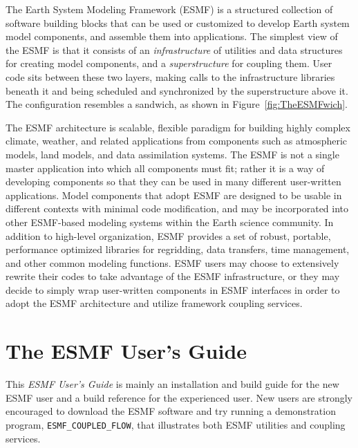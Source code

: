 


The Earth System Modeling Framework (ESMF) is a structured collection of 
software building blocks that can be used or customized to develop 
Earth system model components, and assemble them into applications.  
The simplest view of the ESMF is that it consists of an {\it infrastructure} 
of utilities and data structures for creating 
model components, and a {\it superstructure} for coupling them.  
User code sits between these two layers, making calls to the infrastructure
libraries beneath it and being scheduled and synchronized by the 
superstructure above it.  The configuration resembles a sandwich, as
shown in Figure~\ref{fig:TheESMFwich}.

The ESMF architecture is scalable, flexible paradigm for building highly 
complex climate, weather, and related applications from components such
as atmospheric models, land models, and data assimilation systems.  The 
ESMF is not a single master application into which all components must fit; 
rather it is a way of developing components so that they can be used 
in many different user-written applications.  Model components that adopt 
ESMF are designed to be usable in different contexts with minimal code
modification, and may be
incorporated into other ESMF-based modeling systems within the Earth 
science community.  In addition to high-level organization, ESMF provides 
a set of robust, portable, performance optimized libraries for regridding, 
data transfers, time management, and other common modeling functions.  
ESMF users may choose to extensively rewrite their codes to take advantage 
of the ESMF infrastructure, or they may decide to simply wrap user-written 
components in ESMF interfaces in order to adopt the ESMF architecture and 
utilize framework coupling services.

\section{The ESMF User's Guide}

This {\it ESMF User's Guide} is mainly an installation and build guide for
the new ESMF user and a build reference for the experienced user.  
New users are strongly encouraged to download the ESMF software and try
running a demonstration program, {\tt ESMF\_COUPLED\_FLOW}, that illustrates
both ESMF utilities and coupling services.  

